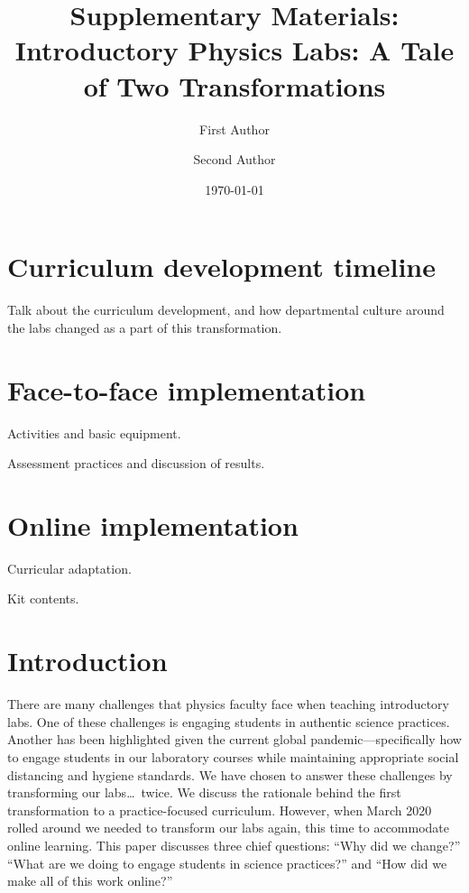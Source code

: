 \documentclass[aip, numerical, preprint]{revtex4-2}
\begin{document}
\title{Supplementary Materials: Introductory Physics Labs: A Tale of Two Transformations}


\author{First Author} 

\author{Second Author} 

\date{\today}


\maketitle

\section{Curriculum development timeline}
Talk about the curriculum development, and how departmental culture around the labs changed as
a part of this transformation.

\section{Face-to-face implementation}

Activities and basic equipment.

Assessment practices and discussion of results.


\section{Online implementation}

Curricular adaptation.

Kit contents.













\section{Introduction}
There are many challenges that physics faculty face when teaching introductory labs. One of
these challenges is engaging students in authentic science practices.  Another has been
highlighted given the current global pandemic---specifically how to engage students in our
laboratory courses while maintaining appropriate social distancing and hygiene standards. We
have chosen to answer these challenges by transforming our labs\ldots\ twice. We discuss the
rationale behind the first transformation to a practice-focused curriculum.  However, when
March 2020 rolled around we needed to transform our labs again, this time to accommodate online
learning. This paper discusses three chief questions: ``Why did we change?'' ``What are we
doing to engage students in science practices?'' and ``How did we make all of this work
online?''
\end{document}
